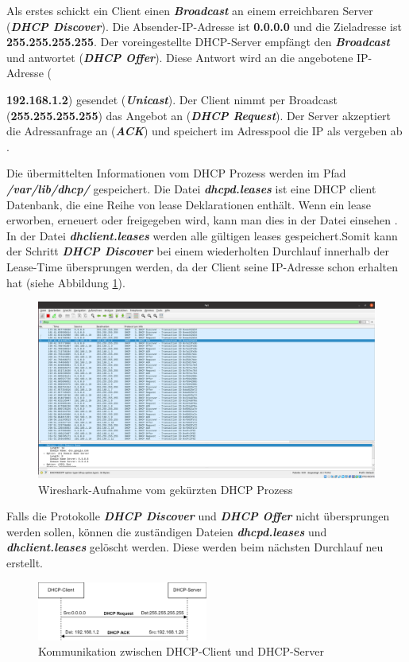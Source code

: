\documentclass[fontsize=12pt,paper=a4,open=any,parskip=half,
  twoside=false,toc=listof,toc=bibliography,fleqn,leqno,
  captions=nooneline,captions=tableabove,british]{scrbook}
\begin{document}
Als erstes schickt ein Client einen \textit{\textbf{Broadcast}} an einem erreichbaren Server (\textit{\textbf{DHCP Discover}}). Die Absender-IP-Adresse ist \textbf{0.0.0.0} und die Zieladresse ist \textbf{255.255.255.255}. Der voreingestellte DHCP-Server empfängt den \textit{\textbf{Broadcast}} und antwortet (\textit{\textbf{DHCP Offer}}). Diese Antwort wird an die angebotene IP-Adresse ({\textbf{192.168.1.2}) gesendet (\textit{\textbf{Unicast}}). Der Client nimmt per Broadcast (\textbf{255.255.255.255}) das Angebot an (\textit{\textbf{DHCP Request}}). Der Server akzeptiert die Adressanfrage an (\textit{\textbf{ACK}}) und speichert im Adresspool die IP als vergeben ab \cite{baun2019grundlagen}. 
\newpage %

Die übermittelten Informationen vom DHCP Prozess werden im Pfad \textit{\textbf{/var/lib/dhcp/}} gespeichert.  Die Datei \textit{\textbf{dhcpd.leases}} ist eine DHCP client Datenbank, die eine Reihe von lease Deklarationen enthält. Wenn ein lease erworben, erneuert oder freigegeben wird, kann man dies in der Datei einsehen \cite{dhcpd2}. In der Datei \textit{\textbf{dhclient.leases}} werden alle gültigen leases gespeichert\cite{dhclient}.Somit kann der Schritt \textit{\textbf{DHCP Discover}} bei einem wiederholten Durchlauf innerhalb der Lease-Time übersprungen werden, da der Client seine IP-Adresse schon erhalten hat \cite{leases} (siehe Abbildung \ref{wireshark2}). 

\begin{figure}[H]
	\centering
	\includegraphics[width=1.0\textwidth]{Bilder/wireshark}
	\captionsetup{justification=centering}
	\caption{Wireshark-Aufnahme vom gekürzten DHCP Prozess}
	\label{wireshark2}
\end{figure}
Falls die Protokolle \textit{\textbf{DHCP Discover}} und \textit{\textbf{DHCP Offer}} nicht übersprungen werden sollen, können die zuständigen Dateien \textit{\textbf{dhcpd.leases}} und \textit{\textbf{dhclient.leases}} gelöscht werden. Diese werden beim nächsten Durchlauf neu erstellt.
\begin{figure}[H]
	\centering
	\includegraphics[width=0.5\textwidth]{Bilder/dhcpshort}
	\captionsetup{justification=centering}
	\caption{Kommunikation zwischen DHCP-Client und DHCP-Server}
	\label{s1}
\end{figure}
\newpage

}
\end{document}
